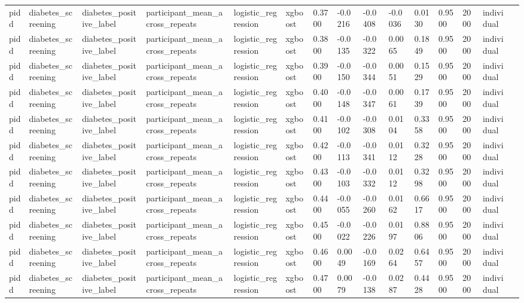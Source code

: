 \begin{tabular}{lllllllllllllll}
pidd & diabetes\_screening & diabetes\_positive\_label & participant\_mean\_across\_repeats & logistic\_regression & xgboost & 0.3700 & -0.0216 & -0.0408 & -0.0036 & 0.0130 & 0.9500 & 2000 & individual &  \\
pidd & diabetes\_screening & diabetes\_positive\_label & participant\_mean\_across\_repeats & logistic\_regression & xgboost & 0.3800 & -0.0135 & -0.0322 & 0.0065 & 0.1849 & 0.9500 & 2000 & individual &  \\
pidd & diabetes\_screening & diabetes\_positive\_label & participant\_mean\_across\_repeats & logistic\_regression & xgboost & 0.3900 & -0.0150 & -0.0344 & 0.0051 & 0.1529 & 0.9500 & 2000 & individual &  \\
pidd & diabetes\_screening & diabetes\_positive\_label & participant\_mean\_across\_repeats & logistic\_regression & xgboost & 0.4000 & -0.0148 & -0.0347 & 0.0061 & 0.1739 & 0.9500 & 2000 & individual &  \\
pidd & diabetes\_screening & diabetes\_positive\_label & participant\_mean\_across\_repeats & logistic\_regression & xgboost & 0.4100 & -0.0102 & -0.0308 & 0.0104 & 0.3358 & 0.9500 & 2000 & individual &  \\
pidd & diabetes\_screening & diabetes\_positive\_label & participant\_mean\_across\_repeats & logistic\_regression & xgboost & 0.4200 & -0.0113 & -0.0341 & 0.0112 & 0.3228 & 0.9500 & 2000 & individual &  \\
pidd & diabetes\_screening & diabetes\_positive\_label & participant\_mean\_across\_repeats & logistic\_regression & xgboost & 0.4300 & -0.0103 & -0.0332 & 0.0112 & 0.3298 & 0.9500 & 2000 & individual &  \\
pidd & diabetes\_screening & diabetes\_positive\_label & participant\_mean\_across\_repeats & logistic\_regression & xgboost & 0.4400 & -0.0055 & -0.0260 & 0.0162 & 0.6617 & 0.9500 & 2000 & individual &  \\
pidd & diabetes\_screening & diabetes\_positive\_label & participant\_mean\_across\_repeats & logistic\_regression & xgboost & 0.4500 & -0.0022 & -0.0226 & 0.0197 & 0.8806 & 0.9500 & 2000 & individual &  \\
pidd & diabetes\_screening & diabetes\_positive\_label & participant\_mean\_across\_repeats & logistic\_regression & xgboost & 0.4600 & 0.0049 & -0.0169 & 0.0264 & 0.6457 & 0.9500 & 2000 & individual &  \\
pidd & diabetes\_screening & diabetes\_positive\_label & participant\_mean\_across\_repeats & logistic\_regression & xgboost & 0.4700 & 0.0079 & -0.0138 & 0.0287 & 0.4428 & 0.9500 & 2000 & individual &  \\

\end{tabular}
